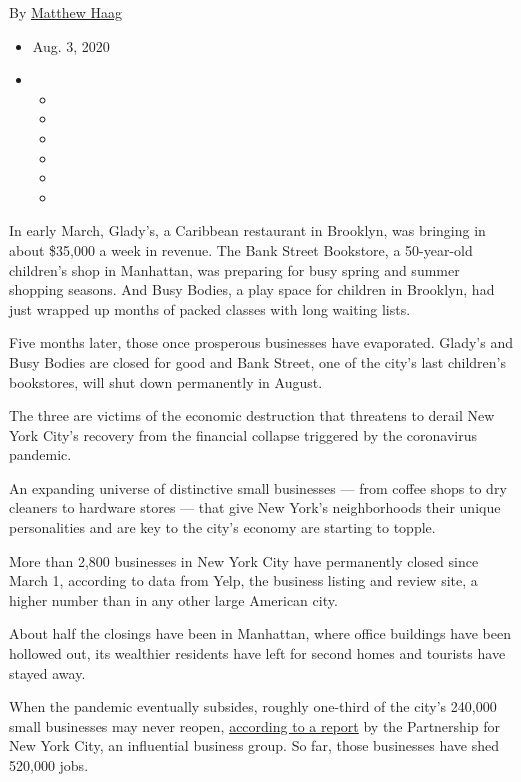 By \href{https://www.nytimes.com/by/matthew-haag}{Matthew Haag}

\begin{itemize}
\item
  Aug. 3, 2020
\item
  \begin{itemize}
  \item
  \item
  \item
  \item
  \item
  \item
  \end{itemize}
\end{itemize}

In early March, Glady's, a Caribbean restaurant in Brooklyn, was
bringing in about \$35,000 a week in revenue. The Bank Street Bookstore,
a 50-year-old children's shop in Manhattan, was preparing for busy
spring and summer shopping seasons. And Busy Bodies, a play space for
children in Brooklyn, had just wrapped up months of packed classes with
long waiting lists.

Five months later, those once prosperous businesses have evaporated.
Glady's and Busy Bodies are closed for good and Bank Street, one of the
city's last children's bookstores, will shut down permanently in August.

The three are victims of the economic destruction that threatens to
derail New York City's recovery from the financial collapse triggered by
the coronavirus pandemic.

An expanding universe of distinctive small businesses --- from coffee
shops to dry cleaners to hardware stores --- that give New York's
neighborhoods their unique personalities and are key to the city's
economy are starting to topple.

More than 2,800 businesses in New York City have permanently closed
since March 1, according to data from Yelp, the business listing and
review site, a higher number than in any other large American city.

About half the closings have been in Manhattan, where office buildings
have been hollowed out, its wealthier residents have left for second
homes and tourists have stayed away.

When the pandemic eventually subsides, roughly one-third of the city's
240,000 small businesses may never reopen,
\href{https://pfnyc.org/wp-content/uploads/2020/07/actionandcollaboration.pdf}{according
to a report} by the Partnership for New York City, an influential
business group. So far, those businesses have shed 520,000 jobs.

